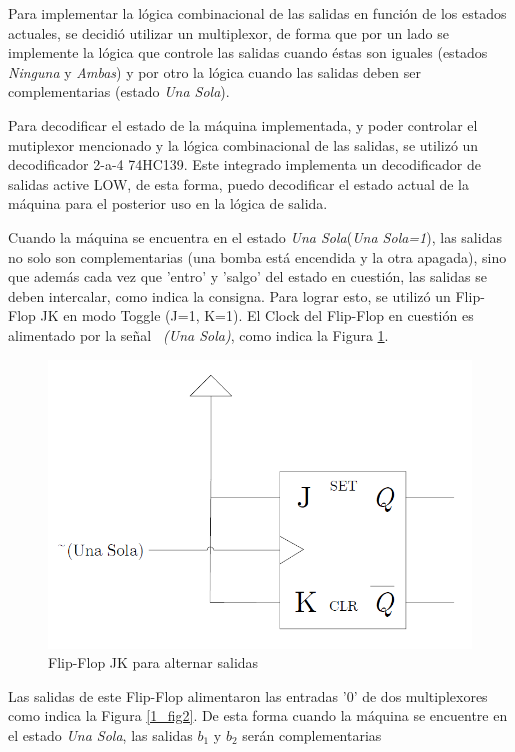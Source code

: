 \documentclass[10pt,a4paper]{article}
\begin{document}
Para implementar la lógica combinacional de las salidas en función de los estados actuales, se decidió utilizar un multiplexor, de forma que por un lado se implemente la lógica que controle las salidas cuando éstas son iguales (estados \emph{Ninguna} y \emph{Ambas}) y por otro la lógica cuando las salidas deben ser complementarias (estado \emph{Una Sola}).

Para decodificar el estado de la máquina implementada, y poder controlar el mutiplexor mencionado y la lógica combinacional de las salidas, se utilizó un decodificador  2-a-4 74HC139. Este integrado implementa un decodificador de salidas active LOW, de esta forma, puedo decodificar el estado actual de la máquina para el posterior uso en la lógica de salida.

Cuando la máquina se encuentra en el estado \emph{Una Sola}(\emph{Una Sola=1}), las salidas no solo son complementarias (una bomba está encendida y la otra apagada), sino que además cada vez que 'entro' y 'salgo' del estado en cuestión, las salidas se deben intercalar, como indica la consigna. Para lograr esto, se utilizó un Flip-Flop JK en modo Toggle (J=1, K=1). El Clock del Flip-Flop en cuestión es alimentado por la señal \emph{~(Una Sola)}, como indica la Figura \ref{1_fig3}.

\begin{figure}[H]
\centering
\includegraphics[scale=0.3]{images/jk_toggle_moore.png}
\caption{Flip-Flop JK para alternar salidas}
\label{1_fig3}
\end{figure}

Las salidas de este Flip-Flop alimentaron las entradas '0' de dos multiplexores como indica la Figura \ref{1_fig2}. De esta forma cuando la máquina se encuentre en el estado \emph{Una Sola}, las salidas $b_1$ y $b_2$ serán complementarias
\end{document}

